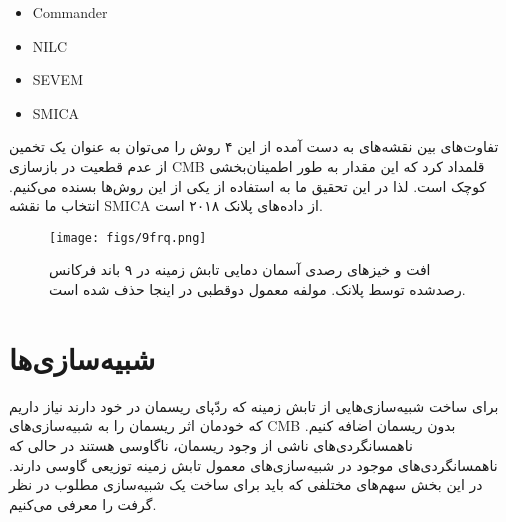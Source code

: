   \begin{itemize}
  	\item Commander
  		\cite{eriksen2008joint , adam2016planck} 
  	\item NILC  
  	  	\cite{basak2013needlet} 
	\item SEVEM 
  	    \cite{leach2008component}  	
	\item SMICA 
  	    \cite{collaborationplanck} 	
  \end{itemize}
تفاوت‌های بین نقشه‌های به دست آمده از این ۴ روش را می‌توان به عنوان یک تخمین از عدم قطعیت در بازسازی CMB قلمداد کرد که این مقدار به طور اطمینان‌بخشی کوچک است.
\cite{akrami2018planck}
لذا در این تحقیق ما به استفاده از یکی از این روش‌ها بسنده می‌کنیم. انتخاب ما نقشه SMICA از داده‌های پلانک ۲۰۱۸ است.

\begin{figure}
	\begin{center}
		\texttt{[image: figs/9frq.png]}
	\end{center}
	\caption{ 
		افت و خیزهای رصدی آسمان دمایی تابش زمینه در ۹ باند فرکانس رصدشده توسط پلانک. مولفه معمول دوقطبی در اینجا حذف شده است. 
		\cite{akrami2018legacy}
	}
	\label{fig:9frq}
\end{figure}

\section{شبیه‌سازی‌ها}
برای ساخت شبیه‌سازی‌هایی از تابش زمینه که ردّپای ریسمان در خود دارند نیاز داریم که خودمان اثر ریسمان را به شبیه‌سازی‌های CMB بدون ریسمان اضافه کنیم. ناهمسانگردی‌های ناشی از وجود ریسمان، ناگاوسی هستند در حالی که ناهمسانگردی‌های موجود در شبیه‌سازی‌های معمول تابش زمینه توزیعی گاوسی دارند. در این بخش سهم‌های مختلفی که باید برای ساخت یک شبیه‌سازی مطلوب در نظر گرفت را معرفی می‌کنیم.
